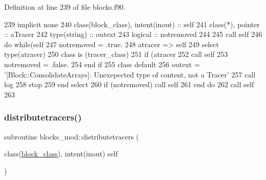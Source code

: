 Definition at line 239 of file blocks.\+f90.


\begin{DoxyCode}
239     \textcolor{keywordtype}{implicit none}
240     \textcolor{keywordtype}{class}(block\_class), \textcolor{keywordtype}{intent(inout)} :: self
241     \textcolor{keywordtype}{class}(*), \textcolor{keywordtype}{pointer} :: aTracer
242     \textcolor{keywordtype}{type}(string) :: outext
243     \textcolor{keywordtype}{logical} :: notremoved
244     
245     \textcolor{keyword}{call }self%
246     \textcolor{keywordflow}{do} \textcolor{keywordflow}{while}(self%
247         notremoved = .true.
248         atracer => self%
249         \textcolor{keywordflow}{select type}(atracer)
250 \textcolor{keywordflow}{        class is} (tracer\_class)
251             \textcolor{keywordflow}{if} (atracer%
252                 \textcolor{keyword}{call }self%
253                 notremoved = .false.                
254 \textcolor{keywordflow}{            end if}
255 \textcolor{keywordflow}{            class default}
256             outext = \textcolor{stringliteral}{'[Block::ConsolidateArrays]: Unexepected type of content, not a Tracer'}
257             \textcolor{keyword}{call }log%
258             stop
259 \textcolor{keywordflow}{        end select}
260         \textcolor{keywordflow}{if} (notremoved) \textcolor{keyword}{call }self%
261 \textcolor{keywordflow}{    end do}
262     \textcolor{keyword}{call }self%
263     
\end{DoxyCode}
\mbox{\label{namespaceblocks__mod_aa178415bcc40cf169744d356e1a09c6b}} 
\subsubsection{\texorpdfstring{distributetracers()}{distributetracers()}}
{\footnotesize\ttfamily subroutine blocks\+\_\+mod\+::distributetracers (\begin{DoxyParamCaption}\item[{class(\mbox{\hyperlink{structblocks__mod_1_1block__class}{block\+\_\+class}}), intent(inout)}]{self }\end{DoxyParamCaption})\hspace{0.3cm}{\ttfamily [private]}}



